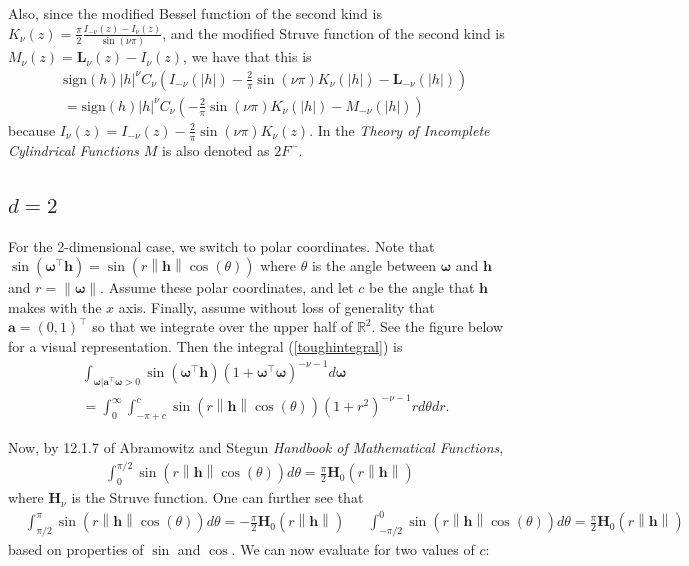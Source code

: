\documentclass[11pt]{article}
\newcommand{\vint}{\boldsymbol{\omega}}
\newcommand{\vpla}{\boldsymbol{a}}
\begin{document}
 Also, since the modified Bessel function of the second kind is $K_\nu (z) = \frac{\pi}{2} \frac{I_{-\nu}(z) - I_\nu(z) }{\sin(\nu \pi)}$, and the modified Struve function of the second kind is $M_\nu(z) = \boldsymbol{L}_{\nu}(z) - I_{\nu}(z)$, we have that this is \begin{align*}
 &\textrm{sign}(h) |h|^{\nu} C_\nu\left(I_{-\nu}(|h|) - \frac{2}{\pi}\sin(\nu\pi) K_{\nu}(|h|)- \boldsymbol{L}_{-\nu} (|h|)\right) \\
 &= \textrm{sign}(h) |h|^{\nu} C_\nu\left(- \frac{2}{\pi}\sin(\nu\pi) K_{\nu}(|h|)- M_{-\nu}(|h|) \right)
 \end{align*}because $I_{\nu}(z) = I_{-\nu}(z) -\frac{2}{\pi}\sin(\nu\pi) K_{\nu}(z)$. In the \textit{Theory of Incomplete Cylindrical Functions} $M$ is also denoted as $2F^-$.
 
 
 \subsection{$d=2$}
 
 
 For the 2-dimensional case, we switch to polar coordinates. Note that $\sin(\vint^\top \boldsymbol{h}) = \sin(r \left\lVert \boldsymbol{h}\right\rVert \cos(\theta))$ where $\theta$ is the angle between $\vint$ and $\boldsymbol{h}$ and $r = \left\lVert \vint \right\rVert$. Assume these polar coordinates, and let $c$ be the angle that $\boldsymbol{h}$ makes with the $x$ axis. Finally, assume without loss of generality that $\boldsymbol{a} = (0,1)^\top$ so that we integrate over the upper half of $\mathbb{R}^2$. See the figure below for a visual representation. Then the integral (\ref{toughintegral}) is \begin{align*}
&\int_{\vint | \vpla^\top \vint > 0}\sin(\vint^\top \boldsymbol{h})(1 + \vint^\top \vint)^{-\nu- 1} d\vint \\
&= \int_0^\infty  \int_{-\pi + c}^{c} \sin(r\left\lVert \boldsymbol{h}\right\rVert \cos(\theta)) (1 +r^2)^{- \nu - 1} r d\theta dr. 
 \end{align*}

 
Now, by 12.1.7 of Abramowitz and Stegun \textit{Handbook of Mathematical Functions}, 
\begin{align*}
 \int_0^{\pi/2}  \sin(r\left\lVert \boldsymbol{h}\right\rVert \cos(\theta)) d\theta= \frac{\pi}{2} \boldsymbol{H}_{0}(r\left\lVert \boldsymbol{h}\right\rVert) \end{align*}where $\boldsymbol{H}_\nu$ is the Struve function. One can further see that \begin{align*}
  &\int_{\pi/2}^\pi  \sin(r\left\lVert \boldsymbol{h}\right\rVert \cos(\theta)) d\theta= -\frac{\pi}{2} \boldsymbol{H}_{0}(r\left\lVert \boldsymbol{h}\right\rVert) &   &\int_{-\pi/2}^0  \sin(r\left\lVert \boldsymbol{h}\right\rVert \cos(\theta)) d\theta= \frac{\pi}{2} \boldsymbol{H}_{0}(r\left\lVert \boldsymbol{h}\right\rVert)
 \end{align*}based on properties of $\sin$ and $\cos$. We can now evaluate for two values of $c$:
 
\end{document}
